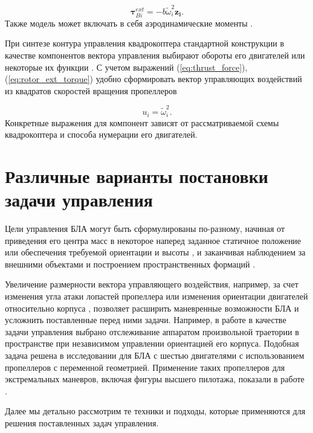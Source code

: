 \begin{equation} \label{eq:rotor_ext_torque}
\bm{\tau}_{Bi}^{ext} = -b \tilde{\omega}^2_i \bm{z_i}.
\end{equation}
Также модель может включать в себя аэродинамические моменты \cite{Solovev01}.

При синтезе контура управления квадрокоптера стандартной конструкции в качестве компонентов вектора управления выбирают обороты его двигателей или некоторые их функции \cite{Sharifi01, Luukkonen01, Bemporad01}.  С учетом выражений (\ref{eq:thrust_force}), (\ref{eq:rotor_ext_torque}) удобно сформировать вектор управляющих воздействий из квадратов скоростей вращения пропеллеров

\begin{equation} \label{eq:common_control_vector}
u_i = \tilde{\omega}_i^2.
\end{equation}
Конкретные выражения для компонент зависят от рассматриваемой схемы квадрокоптера и способа нумерации его двигателей.
 
\section{Различные варианты постановки задачи управления}
Цели управления БЛА могут быть сформулированы по-разному,
начиная от приведения его центра масс в некоторое наперед заданное статичное положение
\cite{Huynh01, Yuskin01}
или обеспечения требуемой ориентации и высоты
\cite{Domingos01, Wang01, Gheorghita01, Lukmana01, Zabko01},
и заканчивая наблюдением за внешними объектами
\cite{Rodriguez01, Kendall01, Razinkova01}
и построением пространственных формаций
\cite{Ali01, Zhao01, Preiss01}.
 
Увеличение размерности вектора управляющего воздействия, например, за счет изменения угла атаки лопастей пропеллера \cite{Cutler01, Cutler02}  или изменения ориентации двигателей относительно корпуса \cite{Sridhar02, Kumar02}, позволяет расширить маневренные возможности БЛА и усложнить поставленные перед ними задачи. Например, в работе \cite{Ryll02} в качестве задачи управления выбрано отслеживание аппаратом произвольной траетории в пространстве при независимом управлении ориентацией его корпуса. Подобная задача решена в исследовании \cite{Kaufman01} для БЛА с шестью двигателями с использованием пропеллеров с переменной геометрией. Применение таких пропеллеров для экстремальных маневров, включая фигуры высшего пилотажа, показали в работе \cite{Cutler02}.
 
Далее мы детально рассмотрим те техники и подходы, которые применяются для решения поставленных задач управления. 

